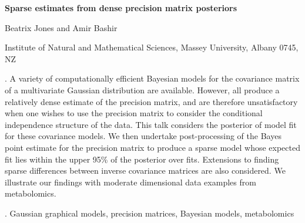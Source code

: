 \documentclass[12pt]{article}
\begin{document}
\begin{flushleft}


{\LARGE\bf Sparse estimates from dense precision matrix posteriors}


\vspace{1.0cm}

Beatrix Jones and Amir Bashir

\begin{description}

\item  Institute of Natural and Mathematical Sciences, Massey University,
Albany 0745, NZ


\end{description}

\end{flushleft}


\vspace{0.75cm}

.
A variety of computationally efficient Bayesian models for the covariance matrix of a multivariate Gaussian distribution are available.  However, all produce a relatively dense estimate of the precision matrix, and are therefore unsatisfactory when one wishes to use the precision matrix to consider the conditional independence structure of the data.  This talk considers the posterior of model fit for these covariance models.  We then undertake post-processing of the Bayes point estimate for the precision matrix to produce a sparse model whose  expected fit  lies within the upper 95\% of the posterior over fits.  Extensions to finding sparse differences between inverse covariance matrices are also considered.   We illustrate our findings with moderate dimensional data examples from metabolomics.  



\vskip 2mm

.
Gaussian graphical models, precision matrices, Bayesian models, metabolomics
\end{document}
